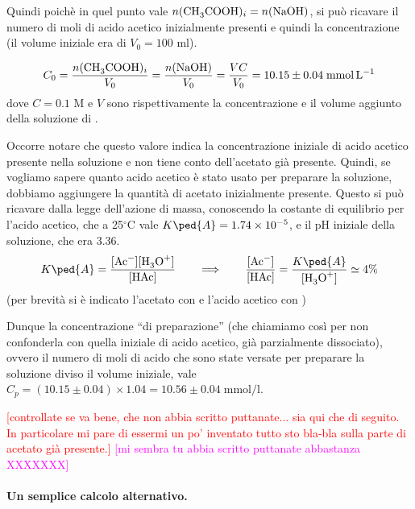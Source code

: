 Quindi poichè in quel punto vale $n(\ce{CH3COOH})_i = n(\ce{NaOH})$, si può ricavare il numero di moli di
acido acetico inizialmente presenti e quindi la concentrazione (il volume iniziale era di $V_0 = 100$ ml).

\begin{equation}
    C_0 = \frac{n(\ce{CH3COOH})_i}{V_0} = \frac{n(\ce{NaOH})}{V_0} = \frac{VC}{V_0} = 10.15 \pm 0.04 \; \si{\milli\mol\per\litre}
\end{equation}
%
dove $C = 0.1$ M e $V$ sono rispettivamente la concentrazione e il volume aggiunto della soluzione di .

Occorre notare che questo valore indica la concentrazione iniziale di acido acetico presente nella soluzione
e non tiene conto dell'acetato già presente. Quindi, se vogliamo sapere quanto acido acetico è stato usato per preparare
la soluzione, dobbiamo aggiungere la quantità di acetato inizialmente presente. Questo si può ricavare
dalla legge dell'azione di massa, conoscendo
la costante di equilibrio %
 per l'acido acetico, che a 25$^\circ$C vale
$K\ped{A} = 1.74 \times 10^{-5}$, e il pH iniziale della soluzione, che era 3.36.
\begin{equation}
    K\ped{A} = \frac{[\ce{Ac-}][\ce{H3O+}]}{[\ce{HAc}]} \qquad
    \Longrightarrow \qquad \frac{[\ce{Ac-}]}{[\ce{HAc}]} = \frac{K\ped{A}}{[\ce{H3O+}]} \simeq 4\%
    \label{eq:massa}
\end{equation}
%
(per brevità si è indicato l'acetato con  e l'acido acetico con )

Dunque la concentrazione ``di preparazione'' (che chiamiamo così per non confonderla con quella iniziale di acido acetico,
già parzialmente dissociato), ovvero il numero di moli di acido che sono state versate per preparare la soluzione
diviso il volume iniziale, vale $C_p = (10.15 \pm 0.04) \times 1.04 = 10.56 \pm 0.04 \; \si{\milli\mol\per\litre}$.

\textcolor{red}{[controllate se va bene, che non abbia scritto puttanate... sia qui che di seguito. In particolare mi pare
di essermi un po' inventato tutto sto bla-bla sulla parte di acetato già presente.]}
\textcolor{magenta}{[mi sembra tu abbia scritto puttanate abbastanza XXXXXXX]}

\paragraph{Un semplice calcolo alternativo.}

